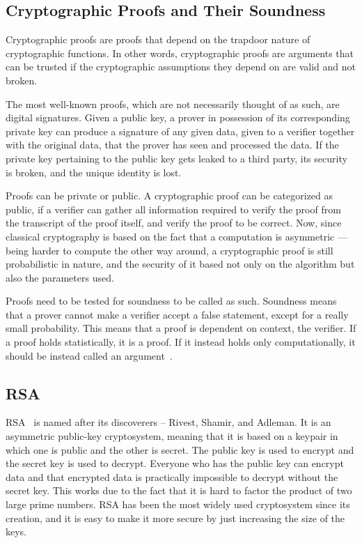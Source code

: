 \subsection{Cryptographic Proofs and Their Soundness}
Cryptographic proofs are proofs that depend on the trapdoor nature of cryptographic functions. In other words, cryptographic proofs are arguments that can be trusted if the cryptographic assumptions they depend on are valid and not broken.

The most well-known proofs, which are not necessarily thought of as such, are digital signatures. Given a public key, a prover in possession of its corresponding private key can produce a signature of any given data, given to a verifier together with the original data, that the prover has seen and processed the data. If the private key pertaining to the public key gets leaked to a third party, its security is broken, and the unique identity is lost.

Proofs can be private or public. A cryptographic proof can be categorized as public, if a verifier can gather all information required to verify the proof from the transcript of the proof itself, and verify the proof to be correct. Now, since classical cryptography is based on the fact that a computation is asymmetric --- being harder to compute the other way around, a cryptographic proof is still probabilistic in nature, and the security of it based not only on the algorithm but also the parameters used.

Proofs need to be tested for soundness to be called as such. Soundness means that a prover cannot make a verifier accept a false statement, except for a really small probability. This means that a proof is dependent on context, the verifier. If a proof holds statistically, it is a proof. If it instead holds only computationally, it should be instead called an argument~\cite{Bitansky2012-uz}.

\subsection{RSA}
RSA~\cite{Rivest1978-fm} is named after its discoverers -- Rivest, Shamir, and Adleman. It is an asymmetric public-key cryptosystem, meaning that it is based on a keypair in which one is public and the other is secret. The public key is used to encrypt and the secret key is used to decrypt. Everyone who has the public key can encrypt data and that encrypted data is practically impossible to decrypt without the secret key. This works due to the fact that it is hard to factor the product of two large prime numbers. RSA has been the most widely used cryptosystem since its creation, and it is easy to make it more secure by just increasing the size of the keys.


